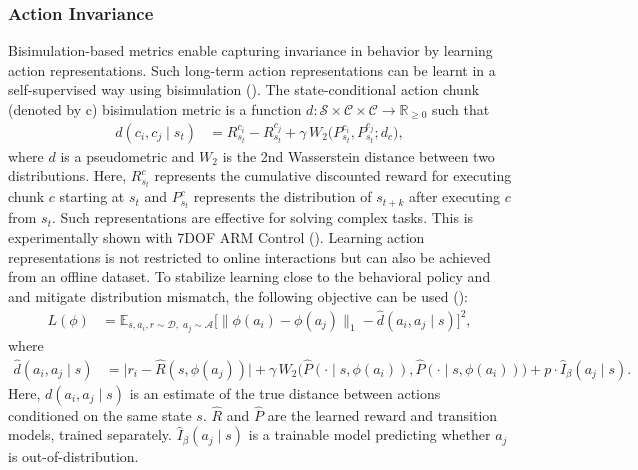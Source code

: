 \documentclass{article}
\begin{document}
\subsubsection{Action Invariance} 
Bisimulation-based metrics enable capturing invariance in behavior by learning action representations. Such long-term action representations can be learnt in a self-supervised way using bisimulation (\cite{shi2024self}). The state-conditional action chunk (denoted by c) bisimulation metric is a function 
$d: \mathcal{S} \times \mathcal{C} \times \mathcal{C} \to \mathbb{R}_{\ge 0}$ such that
\begin{align}
d(c_i, c_j \mid s_t) 
&= R^{c_i}_{s_t} - R^{c_j}_{s_t} 
   + \gamma \, W_2 \big( P^{c_i}_{s_t}, P^{c_j}_{s_t}; d_{c} \big),
\label{eq:bisim_metric}
\end{align}
where $d$ is a pseudometric
and $W_2$ is the 2nd Wasserstein distance between two distributions.  
Here, $R^c_{s_t}$ represents the cumulative discounted reward for executing chunk $c$ starting at $s_t$ and 
$P^c_{s_t}$ represents the distribution of $s_{t+k}$ after executing $c$ from $s_t$.
Such representations are effective for solving complex tasks. This is experimentally shown with 7DOF ARM Control (\cite{shi2024self}).
Learning action representations is not restricted to online interactions but can also be achieved from an offline dataset. To stabilize learning close to the behavioral policy and 
and mitigate distribution mismatch, the following objective can be used (\cite{gu2022learning}):
\begin{align}
L(\phi) 
&= \mathbb{E}_{s, a_i, r \sim \mathcal{D}, \; a_j \sim \mathcal{A}} 
   \Big[ \big\| \phi(a_{i}) - \phi(a_{j}) \big\|_1 - \hat{d}(a_i, a_j \mid s) \Big]^2,
\label{eq:mod_obj}
\end{align}
where
\begin{align}
\hat{d}(a_i, a_j \mid s) 
&= \big| r_{i} - \hat{R}(s, \phi(a_{j})) \big|
   + \gamma \, W_2 \big( \hat{P}(\cdot \mid s,  \phi(a_{i})), \hat{P}(\cdot \mid s,  \phi(a_{i})) \big)
   + p \cdot \hat{I}_\beta(a_j \mid s).
\label{eq:estimated_d}
\end{align}
Here, $d(a_i, a_j \mid s)$ is an estimate of the true distance between actions conditioned on the same state $s$.  $\hat{R}$ and $\hat{P}$ are the learned reward and transition models, trained separately. $\hat{I}_\beta(a_j \mid s)$ is a trainable model predicting whether $a_j$ is out-of-distribution.
\end{document}
